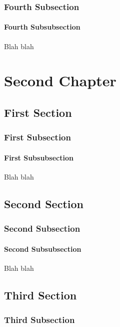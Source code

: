 \documentclass[11pt]{book}
\begin{document}
\subsection{Fourth Subsection}

\subsubsection{Fourth Subsubsection}

Blah blah

\chapter{Second Chapter}

\section{First Section}

\subsection{First Subsection}

\subsubsection{First Subsubsection}

Blah blah

\section{Second Section}

\subsection{Second Subsection}

\subsubsection{Second Subsubsection}

Blah blah

\section{Third Section}

\subsection{Third Subsection}
\end{document}
